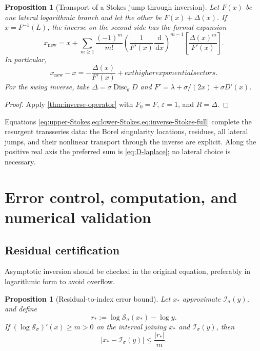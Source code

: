 \documentclass[11pt,a4paper]{article}
\numberwithin{equation}{section}
\newtheorem{proposition}[theorem]{Proposition}
\theoremstyle{definition}
\theoremstyle{remark}
\newcommand{\dd}{\,\mathrm d}
\newcommand{\Disc}{\operatorname{Disc}}
\begin{document}
\begin{proposition}[Transport of a Stokes jump through inversion]
\label{prop:inverse-Stokes}
Let \(F(x)\) be one lateral logarithmic branch and let the other be
\(F(x)+\Delta(x)\).  If \(x=F^{-1}(L)\), the inverse on the second side has
the formal expansion
\begin{equation}\label{eq:inverse-Stokes-full}
 x_{\mathrm{new}}=x+
 \sum_{m\ge1}\frac{(-1)^m}{m!}
 \left(\frac1{F'(x)}\frac{\dd}{\dd x}\right)^{m-1}
 \left[\frac{\Delta(x)^m}{F'(x)}\right].
\end{equation}
In particular,
\begin{equation}\label{eq:inverse-Stokes-leading}
 x_{\mathrm{new}}-x
 =-\frac{\Delta(x)}{F'(x)}+	ext{higher exponential sectors}.
\end{equation}
For the swing inverse, take
\(\Delta=\sigma\Disc_\theta D\) and
\(F'=\lambda+\sigma/(2x)+\sigma D'(x)\).
\end{proposition}

\begin{proof}
Apply \cref{thm:inverse-operator} with \(F_0=F\),
\(\varepsilon=1\), and \(R=\Delta\).
\end{proof}

Equations \cref{eq:upper-Stokes,eq:lower-Stokes,eq:inverse-Stokes-full}
complete the resurgent transseries data: the Borel singularity locations,
residues, all lateral jumps, and their nonlinear transport through the
inverse are explicit.  Along the positive real axis the preferred sum is
\cref{eq:D-laplace}; no lateral choice is necessary.

\section{Error control, computation, and numerical validation}
\label{sec:numerics}

\subsection{Residual certification}

Asymptotic inversion should be checked in the original equation, preferably
in logarithmic form to avoid overflow.

\begin{proposition}[Residual-to-index error bound]\label{prop:residual-bound}
Let \(x_*\) approximate \(\mathcal I_\sigma(y)\), and define
\begin{equation}\label{eq:residual}
 r_*:=\log\mathcal S_\sigma(x_*)-\log y.
\end{equation}
If \((\log\mathcal S_\sigma)'(x)\ge m>0\) on the interval joining \(x_*\)
and \(\mathcal I_\sigma(y)\), then
\begin{equation}\label{eq:residual-bound}
 |x_*-\mathcal I_\sigma(y)|\le\frac{|r_*|}{m}.
\end{equation}
\end{proposition}
\end{document}
